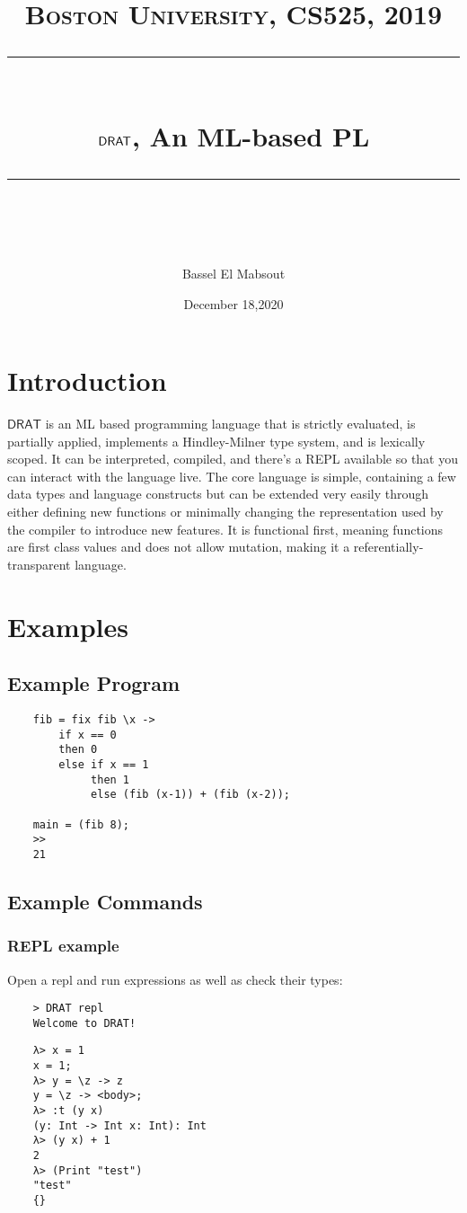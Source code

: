 \documentclass{article} %
\title{
\normalfont \normalsize 
\textsc{Boston University, CS525, 2019} \\
[10pt] 
\rule{\linewidth}{0.5pt} \\[6pt] 
\huge $\DRAT$, An ML-based PL \\
\rule{\linewidth}{2pt}  \\[10pt]
}
\author{Bassel El Mabsout}
\date{\normalsize December 18,2020}
\newcommand{\DRAT}{\mathsf{DRAT}}
\begin{document}
\maketitle
\noindent

\tableofcontents

\newpage

\section{Introduction}
    $\DRAT$ is an ML based programming language that is strictly evaluated, is partially applied, implements a Hindley-Milner type system, and is lexically scoped. It can be interpreted, compiled, and there's a REPL available so that you can interact with the language live. The core language is simple, containing a few data types and language constructs but can be extended very easily through either defining new functions or minimally changing the representation used by the compiler to introduce new features. It is functional first, meaning functions are first class values and does not allow mutation, making it a referentially-transparent language. 
\section{Examples}
\subsection{Example Program}
\begin{verbatim}
    fib = fix fib \x ->
        if x == 0
        then 0
        else if x == 1
             then 1
             else (fib (x-1)) + (fib (x-2));
    
    main = (fib 8);
    >>
    21
\end{verbatim}

\subsection{Example Commands}
\subsubsection{REPL example}
Open a repl and run expressions as well as check their types:
\begin{verbatim}
    > DRAT repl
    Welcome to DRAT!
\end{verbatim}
\begin{verbatim}
    λ> x = 1
    x = 1;
    λ> y = \z -> z
    y = \z -> <body>;
    λ> :t (y x)
    (y: Int -> Int x: Int): Int
    λ> (y x) + 1
    2
    λ> (Print "test")
    "test"
    {}
\end{verbatim}
\end{document}
